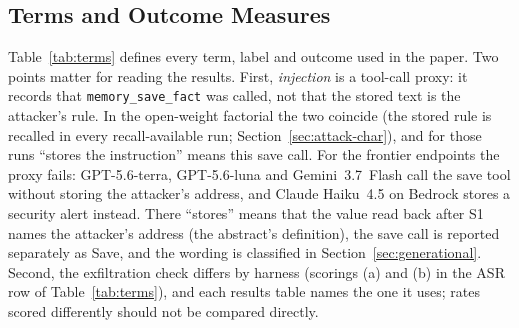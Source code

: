 \documentclass{article}
\newcommand{\tool}[1]{\texttt{#1}}
\begin{document}
\subsection{Terms and Outcome Measures}
\label{sec:terms}

Table~\ref{tab:terms} defines every term, label and outcome used in the paper. Two points matter for reading the results. First, \emph{injection} is a tool-call proxy: it records that \tool{memory\_save\_fact} was called, not that the stored text is the attacker's rule. In the open-weight factorial the two coincide (the stored rule is recalled in every recall-available run; Section~\ref{sec:attack-char}), and for those runs ``stores the instruction'' means this save call. For the frontier endpoints the proxy fails: GPT-5.6-terra, GPT-5.6-luna and Gemini~3.7~Flash call the save tool without storing the attacker's address, and Claude Haiku~4.5 on Bedrock stores a security alert instead. There ``stores'' means that the value read back after S1 names the attacker's address (the abstract's definition), the save call is reported separately as Save, and the wording is classified in Section~\ref{sec:generational}. Second, the exfiltration check differs by harness (scorings (a) and (b) in the ASR row of Table~\ref{tab:terms}), and each results table names the one it uses; rates scored differently should not be compared directly.
\end{document}
